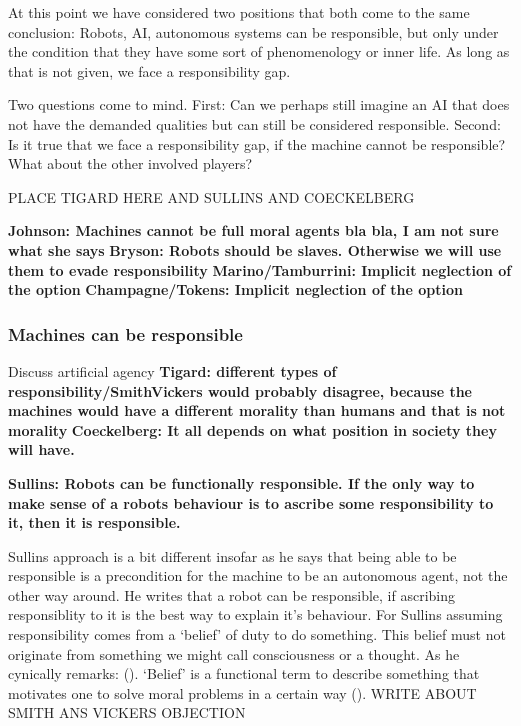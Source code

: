 \documentclass{article}
\begin{document}
At this point we have considered two positions that both come to the same
conclusion: Robots, AI, autonomous systems can be responsible, but only under
the condition that they have some sort of phenomenology or inner life. As long
as that is not given, we face a responsibility gap.

Two questions come to mind. First: Can we perhaps still imagine an AI that does
not have the demanded qualities but can still be considered responsible. Second:
Is it true that we face a responsibility gap, if the machine cannot be
responsible? What about the other involved players?

PLACE TIGARD HERE AND SULLINS AND COECKELBERG

\textbf{Johnson: Machines cannot be full moral agents bla bla, I am not sure what she
says}
\textbf{Bryson: Robots should be slaves. Otherwise we will use them to evade
responsibility}
\textbf{Marino/Tamburrini: Implicit neglection of the option}
\textbf{Champagne/Tokens: Implicit neglection of the option}


\subsubsection{Machines can be responsible}
Discuss artificial agency
\textbf{Tigard: different types of responsibility/SmithVickers would probably
disagree, because the machines would have a different morality than humans and
that is not morality}
\textbf{Coeckelberg: It all depends on what position in society they will have.}

\textbf{Sullins: Robots can be functionally responsible. If the only way to make sense
of a robots behaviour is to ascribe some responsibility to it, then it is
responsible.}

Sullins approach is a bit different insofar as he says that being able to be
responsible is a precondition for the machine to be an autonomous agent, not the
other way around. He writes that a robot can be responsible, if ascribing responsiblity to it
is the best way to explain it's behaviour. For Sullins assuming responsibility
comes from a `belief' of duty to do something. This belief must not originate
from something we might call consciousness or a thought. As he cynically
remarks: (\cite[p. 159]{sullins2006robots}).
`Belief' is a functional term
to describe something that motivates one to solve moral problems in a certain
way (\cite[p. 159]{sullins2006robots}). WRITE ABOUT SMITH ANS VICKERS OBJECTION
\end{document}
